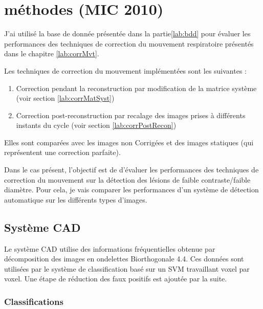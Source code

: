 \chapter{méthodes (MIC 2010)}

J'ai utilisé la base de donnée présentée dans la partie\ref{lab:bdd} pour évaluer les performances des techniques de correction du mouvement respiratoire présentés dans le chapitre \ref{lab:corrMvt}. 

Les techniques de correction du mouvement implémentées sont les suivantes :

\begin{enumerate}
 \item Correction pendant la reconstruction par modification de la matrice système (voir section \ref{lab:corrMatSyst})
 \item Correction post-reconstruction par recalage des images prises à différents instants du cycle (voir section \ref{lab:corrPostRecon})
\end{enumerate}

Elles sont comparées avec les images non Corrigées et des images statiques (qui représentent une correction parfaite).

Dans le cas présent, l'objectif est de d'évaluer les performances des techniques de correction du mouvement sur la détection des lésions de faible contraste/faible diamètre. Pour cela, je vais comparer les performances d'un système de détection automatique sur les différents types d'images.

\section{Système CAD}

Le système CAD utilise des informations fréquentielles obtenue par décomposition des images en ondelettes Biorthogonale 4.4. Ces données sont utilisées par le système de classification basé sur un SVM travaillant voxel par voxel. Une étape de réduction des faux positifs est ajoutée par la suite.

\subsection{Classifications}

